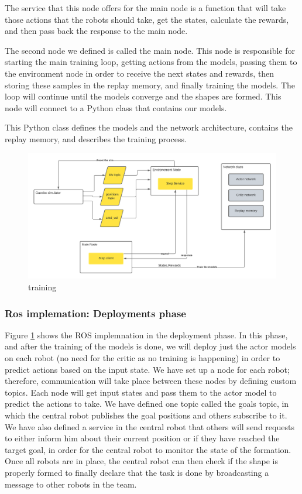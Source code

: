 \documentclass[12pt]{extarticle}
\begin{document}
The service that this node offers for the main node is a function that will take those actions that the robots should take, get the states, calculate the rewards, and then pass back the response to the main node.


The second node we defined is called the main node. This node is responsible for starting the main training loop, getting actions from the models, passing them to the environment node in order to receive the next states and rewards, then storing these samples in the replay memory, and finally training the models. The loop will continue until the models converge and the shapes are formed. This node will connect to a Python class that contains our models.

This Python class defines the models and the network architecture, contains the replay memory, and describes the training process.





 \begin{figure}[H]  
\centering
\includegraphics[scale=0.6]{training}
\caption[training phase]{training}
\label{fig:ros_tr}
\end{figure}


\subsubsection{Ros implemation: Deployments phase}
Figure \ref{fig:ros_tr} shows the ROS implemnation in the deployment phase.
In this phase, and after the training of the models is done, we will deploy just the actor models on each robot (no need for the critic as no training is happening) in order to predict actions based on the input state.
We have set up a node for each robot; therefore, communication will take place between these nodes by defining custom topics. Each node will get input states and pass them to the actor model to predict the actions to take.
We have defined one topic called the goals topic, in which the central robot publishes the goal positions and others subscribe to it.  We have also defined a service in the central robot that others will send requests to either inform him about their current position or if they have reached the target goal, in order for the central robot to monitor the state of the formation.
Once all robots are in place, the central robot can then check if the shape is properly formed to finally declare that the task is done by broadcasting a message to other robots in the team.
  
\end{document}
